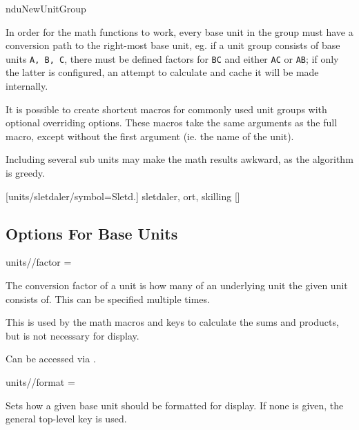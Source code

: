 \documentclass[
	a4paper,
]{article}
\begin{document}
\begin{docCommand}
	{nduNewUnitGroup}
	{}

	In order for the math functions to work, every base unit in the group must have a conversion path to the right-most base unit, eg. if a unit group consists of base units \texttt{A, B, C}, there must be defined factors for \texttt{B\rightarrow C} and either \texttt{A\rightarrow C} or \texttt{A\rightarrow B}; if only the latter is configured, an attempt to calculate and cache it will be made internally.

	It is possible to create shortcut macros for commonly used unit groups with optional overriding options. These macros take the same arguments as the full  macro, except without the first argument (ie. the name of the unit).
	
	Including several sub units may make the math results awkward, as the algorithm is greedy.

\begin{dispExample}
	[units/sletdaler/symbol={Sletd.}]
	{sletdaler, ort, skilling}
	[\mySldl]
\end{dispExample}

\end{docCommand}

\clearpage
\subsection{Options For Base Units}

\begin{docKey}
	[]
	[doc label=units:factor]
	{units//factor}
	{= }
	{}
	
	The conversion factor of a unit is how many of an underlying unit the given unit consists of. This can be specified multiple times.
	
	This is used by the math macros and keys to calculate the sums and products, but is not necessary for display.
	
	Can be accessed via .
\end{docKey}

\begin{docKey}
	[]
	[doc label=units:format]
	{units//format}
	{=}
	{}

	Sets how a given base unit should be formatted for display. If none is given, the general top-level  key is used.
\end{docKey}
\end{document}

